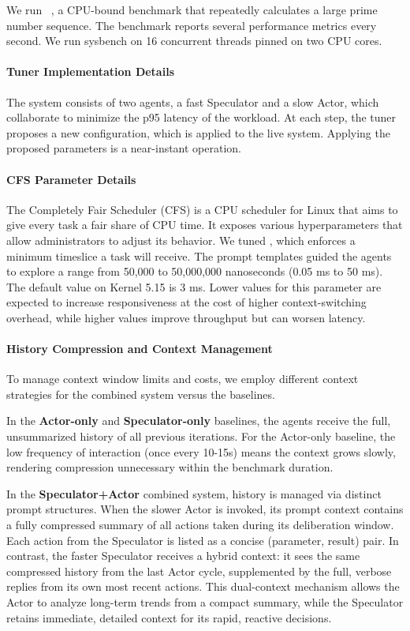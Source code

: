 We run ~\citep{sysbench}, a CPU-bound benchmark that repeatedly calculates a large prime number sequence. The benchmark reports several performance metrics every second. We run sysbench on 16 concurrent threads pinned on two CPU cores.
\paragraph{Tuner Implementation Details}
The system consists of two agents, a fast Speculator and a slow Actor, which collaborate to minimize the p95 latency of the workload. At each step, the tuner proposes a new configuration, which is applied to the live system. Applying the proposed parameters is a near-instant operation.

\paragraph{CFS Parameter Details}
The Completely Fair Scheduler (CFS) is a CPU scheduler for Linux that aims to give every task a fair share of CPU time. It exposes various hyperparameters that allow administrators to adjust its behavior. We tuned , which enforces a minimum timeslice a task will receive. The prompt templates guided the agents to explore a range from 50,000 to 50,000,000 nanoseconds (0.05 ms to 50 ms). The default value on Kernel 5.15 is 3 ms. Lower values for this parameter are expected to increase responsiveness at the cost of higher context-switching overhead, while higher values improve throughput but can worsen latency.

\paragraph{History Compression and Context Management}
\label{app:history_os}
To manage context window limits and costs, we employ different context strategies for the combined system versus the baselines. 

In the \textbf{Actor-only} and \textbf{Speculator-only} baselines, the agents receive the full, unsummarized history of all previous iterations. For the Actor-only baseline, the low frequency of interaction (once every 10-15s) means the context grows slowly, rendering compression unnecessary within the benchmark duration. 

In the \textbf{Speculator+Actor} combined system, history is managed via distinct prompt structures. When the slower Actor is invoked, its prompt context contains a fully compressed summary of all actions taken during its deliberation window. Each action from the Speculator is listed as a concise (parameter, result) pair. In contrast, the faster Speculator receives a hybrid context: it sees the same compressed history from the last Actor cycle, supplemented by the full, verbose replies from its own most recent actions. This dual-context mechanism allows the Actor to analyze long-term trends from a compact summary, while the Speculator retains immediate, detailed context for its rapid, reactive decisions.

